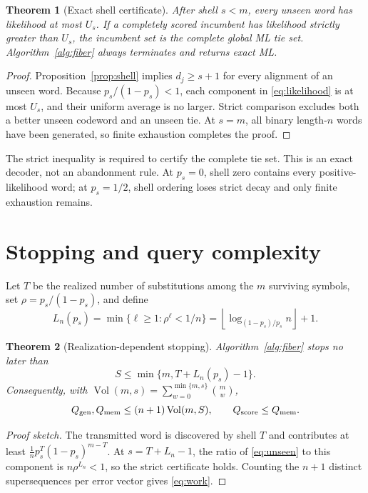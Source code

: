 \documentclass[conference]{IEEEtran}
\newtheorem{theorem}{Theorem}
\newcommand{\Vol}{\operatorname{Vol}}
\begin{document}
\begin{theorem}[Exact shell certificate]\label{thm:certificate}
After shell $s<m$, every unseen word has likelihood at most $U_s$. If a completely scored incumbent
has likelihood strictly greater than $U_s$, the incumbent set is the complete global ML tie set.
Algorithm~\ref{alg:fiber} always terminates and returns exact ML.
\end{theorem}
\begin{proof}
Proposition~\ref{prop:shell} implies $d_j\ge s+1$ for every alignment of an unseen word. Because
$p_s/(1-p_s)<1$, each component in \eqref{eq:likelihood} is at most $U_s$, and their uniform average
is no larger. Strict comparison excludes both a better unseen codeword and an unseen tie. At
$s=m$, all binary length-$n$ words have been generated, so finite exhaustion completes the proof.
\end{proof}
The strict inequality is required to certify the complete tie set. This is an exact decoder, not an
abandonment rule. At $p_s=0$, shell zero contains every positive-likelihood word; at $p_s=1/2$,
shell ordering loses strict decay and only finite exhaustion remains.

\section{Stopping and query complexity}
Let $T$ be the realized number of substitutions among the $m$ surviving symbols, set
$\rho=p_s/(1-p_s)$, and define
\begin{equation}
 L_n(p_s)=\min\{\ell\ge1:\rho^\ell<1/n\}
 =\left\lfloor\log_{(1-p_s)/p_s}n\right\rfloor+1. \label{eq:Ln}
\end{equation}

\begin{theorem}[Realization-dependent stopping]\label{thm:stop}
Algorithm~\ref{alg:fiber} stops no later than
\begin{equation}
 S\le \min\{m,T+L_n(p_s)-1\}. \label{eq:stop}
\end{equation}
Consequently, with $\Vol(m,s)=\sum_{w=0}^{\min\{m,s\}}\binom mw$,
\begin{equation}
 Q_{\rm gen},Q_{\rm mem}\le(n+1)\Vol(m,S),\qquad Q_{\rm score}\le Q_{\rm mem}. \label{eq:work}
\end{equation}
\end{theorem}
\begin{proof}[Proof sketch]
The transmitted word is discovered by shell $T$ and contributes at least
$\frac1n p_s^T(1-p_s)^{m-T}$. At $s=T+L_n-1$, the ratio of \eqref{eq:unseen} to this component is
$n\rho^{L_n}<1$, so the strict certificate holds. Counting the $n+1$ distinct supersequences per
error vector gives \eqref{eq:work}.
\end{proof}
\end{document}
